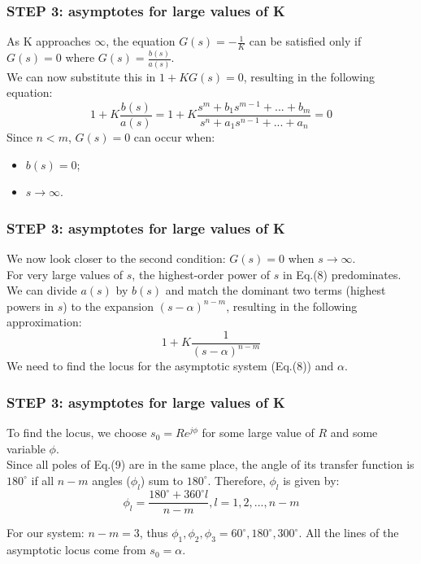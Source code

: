 \begin{frame}
\frametitle{STEP 3: asymptotes for large values of K}
	As K approaches $\infty$, the equation $G(s) = -\frac{1}{K}$ can be satisfied only if $G(s) = 0$ where $G(s) = \frac{b(s)}{a(s)}$.\\
	\vspace{1em}
	We can now substitute this in $1 + KG(s) = 0$, resulting in the following equation:
	\begin{equation}
	1 + K\frac{b(s)}{a(s)} = 1 + K\frac{s^m + b_1s^{m-1} + ... + b_m}{s^n + a_1s^{n-1} + ... + a_n} = 0
	\end{equation}
	Since $n < m$, $G(s) = 0$ can occur when: 
	\begin{itemize}
		\item $b(s) = 0$;
		\item $s \rightarrow \infty$.
	\end{itemize}
\end{frame}

\begin{frame}
\frametitle{STEP 3: asymptotes for large values of K}
	We now look closer to the second condition: $G(s) = 0$ when $s \rightarrow \infty$.\\
	\vspace{1em}
	For very large values of $s$, the highest-order power of $s$ in Eq.(8) predominates. We can divide $a(s)$ by $b(s)$ and match the dominant two terms (highest powers in $s$) to the expansion $(s-\alpha)^{n-m}$, resulting in the following approximation:
	\begin{equation}
		1 + K\frac{1}{(s-\alpha)^{n-m}}
	\end{equation}
	We need to find the locus for the asymptotic system (Eq.(8)) and $\alpha$.
\end{frame}

\begin{frame}	
\frametitle{STEP 3: asymptotes for large values of K}
	To find the locus, we choose $s_0 = Re^{j\phi}$ for some large value of $R$ and some variable $\phi$.\\
	\vspace{1em}
	Since all poles of Eq.(9) are in the same place, the angle of its transfer function is $180^{\circ}$ if all $n-m$ angles ($\phi_l$) sum to $180^{\circ}$. Therefore, $\phi_l$ is given by: 
	\begin{equation}
	\phi_l = \frac{180^{\circ} + 360^{\circ}l}{n-m}, l = 1,2,...,n-m
	\end{equation}	
	\vspace{-0.5em}	
	\begin{exampleblock}{}
	For our system: $n-m=3$, thus $\phi_1, \phi_2, \phi_3 = 60^{\circ}, 180^{\circ}, 300^{\circ}$.
	All the lines of the asymptotic locus come from $s_0 = \alpha$.
	\end{exampleblock}
\end{frame}

